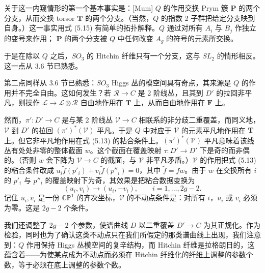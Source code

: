 关于这一内窥情形的第一个基本事实是：[Mum] $Q$ 的作用交换 Prym 簇 $\boldsymbol{P}$ 的两个分支，从而交换 torsor $\boldsymbol{T}$ 的两个分支。（当然，$Q$ 的指数 2 子群把给定分支映到自身。）这一事实用式 (5.15) 有简单的拓扑解释。$Q$ 通过对所有 $A_i$ 与 $B_j$ 作独立的变号来作用；
$\boldsymbol{P}$ 的两个分支被 $Q$ 中任何改变 $A_g$ 的符号的元素所交换。

于是在除以 $Q$ 之后，$SO_3$ 的 Hitchin 纤维只有一个分支，这与 $SL_2$ 的情形相反。这一点从 3.6 节已熟悉。

第二点同样从 3.6 节已熟悉：$SO_3$ Higgs 丛的模空间具有奇点，其来源是 $Q$ 的作用并不完全自由。这如何发生？若 $\mathcal{R}\to C$ 是 2 阶线丛，且其到 $D'$ 的拉回非平凡，则操作 $\mathcal{L}\to\mathcal{L}\otimes\mathcal{R}$ 自由地作用在 $\boldsymbol{T}$ 上，从而自由地作用在 $\boldsymbol{F}$ 上。

然而，$\pi': D'\to C$ 是与某 2 阶线丛 $\mathcal{V}\to C$ 相联系的非分歧二重覆盖，而同义地，$\mathcal{V}$ 到 $D'$ 的拉回 $(\pi')^*(\mathcal{V})$ 平凡。于是 $Q$ 中对应于 $\mathcal{V}$ 的元素平凡地作用在 $\boldsymbol{T}$ 上。但它非平凡地作用在式 (5.13) 的粘合条件上。$(\pi')^*(\mathcal{V})$ 平凡意味着该线丛有处处非零的整体截面 $w$。这个截面在覆盖映射 $\tau: D'\to D'$ 下是奇的而非偶的。（否则 $w$ 会下降为 $\mathcal{V}\to C$ 的截面，与 $\mathcal{V}$ 非平凡矛盾。）$\mathcal{V}$ 的作用把式 (5.13) 的粘合条件改成 $u_i\tilde{f}(p'_i) + v_i\tilde{f}(p''_i) = 0$，其中 $\tilde{f} = f w$。由于 $w$ 在交换所有 $i$ 的 $p'_i$ 与 $p''_i$ 的覆盖映射下为奇，其效果是把粘合数据变换为
\begin{equation}\tag{5.16}
(u_i,v_i)\to (u_i,-v_i),\qquad i=1,\dots,2g-2.
\end{equation}
记住 $u_i,v_i$ 是一份 $\mathbb{CP}^1$ 的齐次坐标，$\mathcal{V}$ 的不动点条件是：对所有 $i$，$u_i$ 或 $v_i$ 必须为零。这是 $2g-2$ 个条件。

我们还调整了 $2g-2$ 个参数，使谱曲线 $D$ 以二重覆盖 $D'\to C$ 为其正规化。作为检验，同时也为了确认这类不动点只在我们所假定的那类谱曲线上出现，我们注意到：$Q$ 作用保持 Higgs 丛模空间的复辛结构，而 Hitchin 纤维是拉格朗日的，这蕴含着——为使某点成为不动点而必须在 Hitchin 纤维化的纤维上调整的参数个数，等于必须在底上调整的参数个数。


